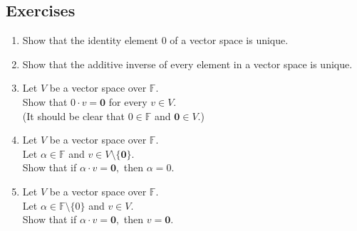 \documentclass{article}
\begin{document}
\subsection{Exercises}
\begin{enumerate}[nosep] 
	\item Show that the identity element $0$ of a vector space is unique.
	\item Show that the additive inverse of every element in a vector space is unique.
	\item Let $V$ be a vector space over $\mathbb{F}.$ \\
	Show that $0\cdot v = \mathbf{0}$ for every $v \in V.$\\
	(It should be clear that $0 \in\mathbb{F}$ and $\mathbf{0} \in V.$)
	\item Let $V$ be a vector space over $\mathbb{F}.$ \\
	Let $\alpha \in \mathbb{F}$ and $v \in V\setminus\{\mathbf{0}\}.$\\
	Show that if $\alpha\cdot v = \mathbf{0},$ then $\alpha = 0.$
	\item Let $V$ be a vector space over $\mathbb{F}.$ \\
	Let $\alpha \in \mathbb{F}\setminus\{0\}$ and $v \in V.$\\
	Show that if $\alpha\cdot v = \mathbf{0},$ then $v = \mathbf{0}.$
\end{enumerate}
\end{document}
